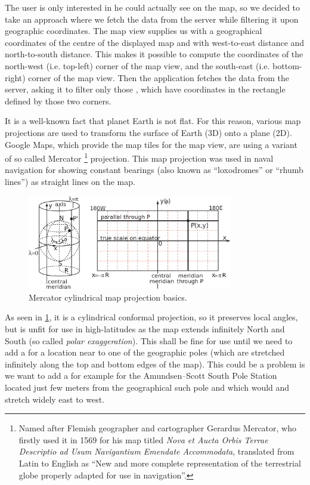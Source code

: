 \documentclass[11pt]{book}
\begin{document}
The user is only interested in \wallentityp he could actually see on the map, so we decided to take an approach where we fetch the data from the server while filtering it upon geographic coordinates. The map view supplies us with a geographical coordinates of the centre of the displayed map and with west-to-east distance and north-to-south distance. This makes it possible to compute the coordinates of the north-west (i.e. top-left) corner of the map view, and the south-east (i.e. bottom-right) corner of the map view. Then the application fetches the data from the server, asking it to filter only those \wallentityp, which have coordinates in the rectangle defined by those two corners.

It is a well-known fact that planet Earth is not flat. For this reason, various map projections are used to transform the surface of Earth (3D) onto a plane (2D). Google Maps, which provide the map tiles for the map view, are using a variant of so called Mercator \footnote{Named after Flemish geographer and cartographer Gerardus Mercator, who firstly used it in 1569 for his map titled \emph{Nova et Aucta Orbis Terrae Descriptio ad Usum Navigantium Emendate Accommodata}, translated from Latin to English as ``New and more complete representation of the terrestrial globe properly adapted for use in navigation''.} projection. This map projection was used in naval navigation for showing constant bearings (also known as ``loxodromes'' or ``rhumb lines'') as straight lines on the map. \cite{progonos:mercator,radicalcartography}

\begin{figure}[H]
    \centering
    \includegraphics[width=0.8\textwidth]{Figures/Prestudy/mercator.png}
    \caption{Mercator cylindrical map projection basics. \cite{wikipedia:mercator}}
    \label{fig:mercator}
\end{figure}

As seen in \ref{fig:mercator}, it is a cylindrical conformal projection, so it preserves local angles, but is unfit for use in high-latitudes as the map extends infinitely North and South (so called \emph{polar exaggeration}). This shall be fine for use until we need to add a \wallentitys for a location near to one of the geographic poles (which are stretched infinitely along the top and bottom edges of the map). This could be a problem is we want to add a \wallentitys for example for the Amundsen–Scott South Pole Station located just few meters from the geographical such pole and which would and stretch widely east to west. \cite{progonos:mercator,radicalcartography} 
\end{document}
